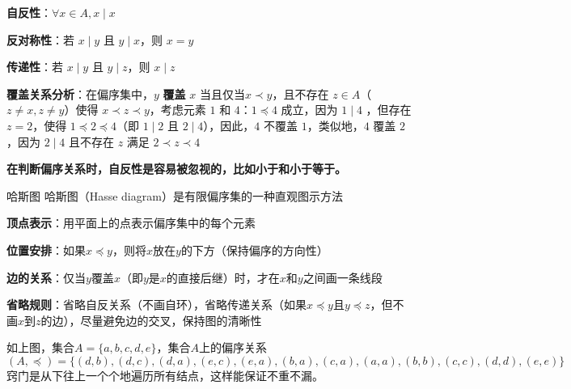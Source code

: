 \documentclass[lang=cn,11pt]{elegantbook}
\begin{document}
\textbf{自反性}：$\forall x \in A, x \mid x$

\textbf{反对称性}：若 $x \mid y$ 且 $y \mid x$，则 $x = y$

\textbf{传递性}：若 $x \mid y$ 且 $y \mid z$，则 $x \mid z$

\textbf{覆盖关系分析}：在偏序集中，$y$ \textbf{覆盖} $x$ 当且仅当$x \prec y$，且不存在 $z \in A$（$z \neq x, z \neq y$）使得 $x \prec z \prec y$，考虑元素 $1$ 和 $4$：$1 \preccurlyeq 4$ 成立，因为 $1 \mid 4$
，但存在 $z = 2$，使得 $1 \preccurlyeq 2 \preccurlyeq 4$（即 $1 \mid 2$ 且 $2 \mid 4$），因此，$4$ 不覆盖 $1$，类似地，$4$ 覆盖 $2$，因为 $2 \mid 4$ 且不存在 $z$ 满足 $2 \prec z \prec 4$

\textbf{在判断偏序关系时，自反性是容易被忽视的，比如小于和小于等于。}
\begin{definition}{哈斯图}
哈斯图（Hasse diagram）是有限偏序集的一种直观图示方法

\textbf{顶点表示}：用平面上的点表示偏序集中的每个元素

\textbf{位置安排}：如果$x \preccurlyeq y$，则将$x$放在$y$的下方（保持偏序的方向性）

\textbf{边的关系}：仅当$y$覆盖$x$（即$y$是$x$的直接后继）时，才在$x$和$y$之间画一条线段

\textbf{省略规则}：省略自反关系（不画自环），省略传递关系（如果$x \preccurlyeq y$且$y \preccurlyeq z$，但不画$x$到$z$的边），尽量避免边的交叉，保持图的清晰性
\end{definition}
\begin{figure}[!ht]
\centering
{}%
\end{figure}
如上图，集合$A=\{a,b,c,d,e\}$，集合$A$上的偏序关系\[(A,\preccurlyeq)=\{(d,b),(d,c),(d,a),(e,c),(e,a),(b,a),(c,a),(a,a),(b,b),(c,c),(d,d),(e,e)\}\]窍门是从下往上一个个地遍历所有结点，这样能保证不重不漏。
\end{document}
